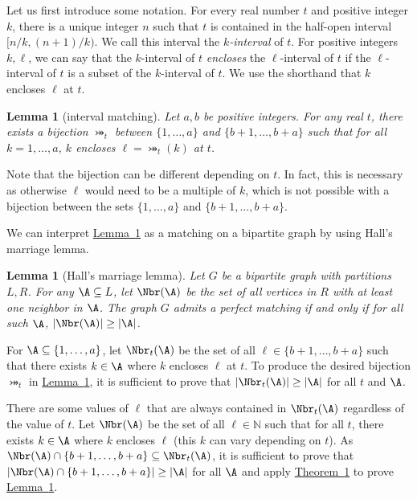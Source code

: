 \documentclass[11pt]{article}
\numberwithin{equation}{section}
\newtheorem{lemma}[theorem]{Lemma}
\theoremstyle{definition}
\theoremstyle{plain}
\newcommand{\expref}[2]{\hyperref[#2]{#1~\ref{#2}}}
\begin{document}
Let us first introduce some notation. For every real number $t$ and positive integer $k$, there is a unique integer $n$ such that $t$ is contained in the half-open interval $[n/k, (n+1)/k)$. We call this interval the \emph{$k$-interval} of $t$. For positive integers $k,\ell$, we can say that the $k$-interval of $t$ \emph{encloses} the $\ell$-interval of $t$ if the $\ell$-interval of $t$ is a subset of the $k$-interval of $t$. We use the shorthand that $k$ encloses $\ell$ at $t$.

\begin{lemma}[interval matching]
    \label{lemma:intervalmatching}
    Let $a,b$ be positive integers. For any real $t$, there exists a bijection $\bij_t$ between $\{1,\dots,a\}$ and $\{b+1,\dots,b+a\}$ such that for all $k=1,\dots,a$, $k$ encloses $\ell=\bij_t(k)$ at $t$.
\end{lemma}
Note that the bijection can be different depending on $t$. In fact, this is necessary as otherwise $\ell$ would need to be a multiple of $k$, which is not possible with a bijection between the sets $\{1,\dots,a\}$ and $\{b+1,\dots,b+a\}$.

We can interpret \expref{Lemma}{lemma:intervalmatching} as a matching on a bipartite graph by using Hall's marriage lemma.

\begin{lemma}[Hall's marriage lemma]
    \label{thm:hall}
    Let $G$ be a bipartite graph with partitions $L,R$. For any $\A\subseteq L$, let $\Nbr(\A)$ be the set of all vertices in $R$ with at least one neighbor in $\A$. The graph $G$ admits a perfect matching if and only if for all such $\A$, $|\Nbr(\A)|\ge |\A|$. 
\end{lemma}

For $\A\subseteq \{1,\dots,a\}$, let $\Nbr_t(\A)$ be the set of all $\ell\in\{b+1,\dots,b+a\}$ such that there exists $k\in \A$ where $k$ encloses $\ell$ at $t$. To produce the desired bijection $\bij_t$ in \expref{Lemma}{lemma:intervalmatching}, it is sufficient to prove that $|\Nbr_t(\A)|\ge |\A|$ for all $t$ and $\A$.

There are some values of $\ell$ that are always contained in $\Nbr_t(\A)$ regardless of the value of $t$. Let $\Nbr(\A)$ be the set of all $\ell\in\mathbb{N}$ such that for all $t$, there exists $k\in \A$ where $k$ encloses $\ell$ (this $k$ can vary depending on $t$). As $\Nbr(\A)\cap \{b+1,\dots,b+a\}\subseteq \Nbr_t(\A)$, it is sufficient to prove that $|\Nbr(\A)\cap \{b+1,\dots,b+a\}|\ge |\A|$ for all $\A$ and apply \expref{Theorem}{thm:hall} to prove \expref{Lemma}{lemma:intervalmatching}.
\end{document}
